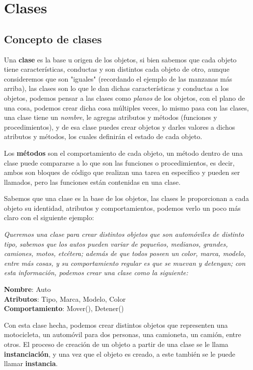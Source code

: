 \section{Clases}


\subsection{Concepto de clases}

Una \textbf{clase} es la base u origen de los objetos, si bien sabemos que cada objeto tiene características, conductas y son distintos cada objeto de otro, aunque consideremos que son "iguales" (recordando el ejemplo de las manzanas más arriba), las clases son lo que le dan dichas características y conductas a los objetos, podemos pensar a las clases como \textit{planos} de los objetos, con el plano de una cosa, podemos crear dicha cosa múltiples veces, lo mismo pasa con las clases, una clase tiene un \textit{nombre}, le agregas atributos y métodos (funciones y procedimientos), y de esa clase puedes crear objetos y darles valores a dichos atributos y métodos, los cuales definirán el estado de cada objeto.

Los \textbf{métodos} son el comportamiento de cada objeto, un método dentro de una clase puede compararse a lo que son las funciones o procedimientos, es decir, ambos son bloques de código que realizan una tarea en específico y pueden ser llamados, pero las funciones están contenidas en una clase.

Sabemos que una clase es la base de los objetos, las clases le proporcionan a cada objeto su identidad, atributos y comportamientos, podemos verlo un poco más claro con el siguiente ejemplo:

\textit{Queremos una clase para crear distintos objetos que son automóviles de distinto tipo, sabemos que los autos pueden variar de pequeños, medianos, grandes, camiones, motos, etcétera; además de que todos poseen un color, marca, modelo, entre más cosas, y su comportamiento regular es que se muevan y detengan; con esta información, podemos crear una clase como la siguiente:}
\begin{center}
    \textbf{Nombre}: Auto \\
    \textbf{Atributos}: Tipo, Marca, Modelo, Color \\
    \textbf{Comportamiento}: Mover(), Detener()
\end{center}

Con esta clase hecha, podemos crear distintos objetos que representen una motocicleta, un automóvil para dos personas, una camioneta, un camión, entre otros. El proceso de creación de un objeto a partir de una clase se le llama \textbf{instanciación}, y una vez que el objeto es creado, a este también se le puede llamar \textbf{instancia}.

